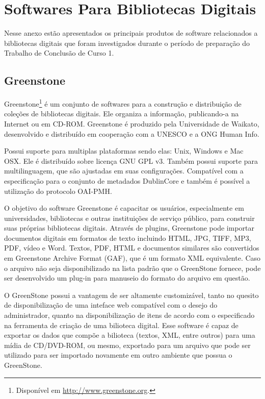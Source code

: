 \chapter{Softwares Para Bibliotecas Digitais}
\label{Att:anexobibliotecas}

Nesse anexo estão apresentados os principais produtos de software relacionados a bibliotecas digitais que foram investigados durante o período de preparação do Trabalho de Conclusão de Curso 1.

\section*{Greenstone} 
Greenstone\footnote{Disponível em \url{http://www.greenstone.org}.} é um conjunto de softwares para a construção e distribuição de coleções de bibliotecas digitais. Ele organiza a informação, publicando-a na Internet ou em CD-ROM. Greenstone é produzido pela Universidade de Waikato, desenvolvido e distribuído em cooperação com a UNESCO e a ONG Human Info.

Possui suporte para multiplas plataformas sendo elas: Unix, Windows e Mac OSX. Ele é distribuído sobre licença GNU GPL v3. Também possui suporte para multilinguagem, que são ajustadas em suas configurações. Compatível com a especificação para o conjunto de metadados DublinCore e também é possível a utilização do protocolo OAI-PMH.

O objetivo do software Greenstone é capacitar os usuários, especialmente em universidades, bibliotecas e outras instituições de serviço público, para construir suas próprias bibliotecas digitais. Através de plugins, Greenstone pode importar documentos digitais em formatos de texto incluindo HTML, JPG, TIFF, MP3, PDF, vídeo e Word. Textos, PDF, HTML e documentos similares são convertidos em Greenstone Archive Format (GAF), que é um formato XML equivalente. Caso o arquivo não seja disponibilizado na lista padrão que o GreenStone fornece, pode ser desenvolvido um plug-in para manuseio do formato do arquivo em questão.

O GreenStone possui a vantagem de ser altamente customizável, tanto no quesito de disponibilização de uma inteface web compatível com o desejo do administrador, quanto na disponibilização de itens de acordo com o especificado na ferramenta de criação de uma bilioteca digital. Esse software é capaz de exportar os dados que compõe a bilioteca (textos, XML, entre outros) para uma mídia de CD/DVD-ROM, ou mesmo, exportado para um arquivo que pode ser utilizado para ser importado novamente em outro ambiente que possua o GreenStone.


